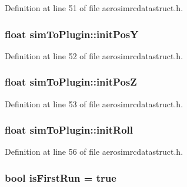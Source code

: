\-Definition at line 51 of file aerosimrcdatastruct.\-h.

\hypertarget{group___aero_sim_r_c_gacb4ac6e2ad9d5f215153b9fea05b66bf}{
\subsubsection[{init\-Pos\-Y}]{\setlength{\rightskip}{0pt plus 5cm}float {\bf sim\-To\-Plugin\-::init\-Pos\-Y}}}\label{group___aero_sim_r_c_gacb4ac6e2ad9d5f215153b9fea05b66bf}


\-Definition at line 52 of file aerosimrcdatastruct.\-h.

\hypertarget{group___aero_sim_r_c_ga020dda7446e3217a8c779458a74feec8}{
\subsubsection[{init\-Pos\-Z}]{\setlength{\rightskip}{0pt plus 5cm}float {\bf sim\-To\-Plugin\-::init\-Pos\-Z}}}\label{group___aero_sim_r_c_ga020dda7446e3217a8c779458a74feec8}


\-Definition at line 53 of file aerosimrcdatastruct.\-h.

\hypertarget{group___aero_sim_r_c_ga26c1191f08e580c1cdbd02791eabe60e}{
\subsubsection[{init\-Roll}]{\setlength{\rightskip}{0pt plus 5cm}float {\bf sim\-To\-Plugin\-::init\-Roll}}}\label{group___aero_sim_r_c_ga26c1191f08e580c1cdbd02791eabe60e}


\-Definition at line 56 of file aerosimrcdatastruct.\-h.

\hypertarget{group___aero_sim_r_c_gae612ff4fcd9d86f5ce097c2583d2bfee}{
\subsubsection[{is\-First\-Run}]{\setlength{\rightskip}{0pt plus 5cm}bool {\bf is\-First\-Run} = true}}\label{group___aero_sim_r_c_gae612ff4fcd9d86f5ce097c2583d2bfee}


